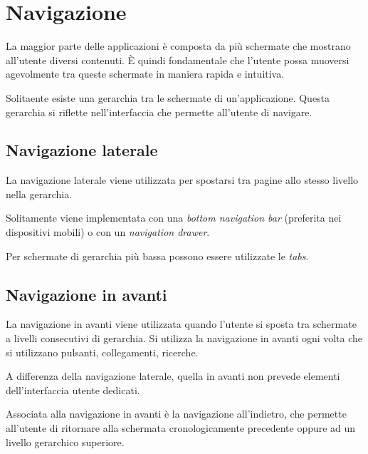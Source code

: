 \documentclass[12pt, a4paper]{report}
\begin{document}
		
	\section{Navigazione}
    	La maggior parte delle applicazioni è composta da più schermate che mostrano all’utente diversi contenuti. È quindi fondamentale che l’utente possa muoversi agevolmente tra queste schermate in maniera rapida e intuitiva.
    	
    	Solitaente esiste una gerarchia tra le schermate di un'applicazione. Questa gerarchia si riflette nell'interfaccia che permette all'utente di navigare.
    	
    		\subsection{Navigazione laterale}
    		La navigazione laterale viene utilizzata per spostarsi tra pagine allo stesso livello nella gerarchia.
    		
    		Solitamente viene implementata con una \textit{bottom navigation bar} (preferita nei dispositivi mobili) o con un \textit{navigation drawer}.
    		
    		Per schermate di gerarchia più bassa possono essere utilizzate le \textit{tabs}.
    		
    		\subsection{Navigazione in avanti}
    		La navigazione in avanti viene utilizzata quando l'utente si sposta tra schermate a livelli consecutivi di gerarchia. Si utilizza la navigazione in avanti ogni volta che si utilizzano pulsanti, collegamenti, ricerche.
    		
    		A differenza della navigazione laterale, quella in avanti non prevede elementi dell'interfaccia utente dedicati.
    		
    		Associata alla navigazione in avanti è la navigazione all'indietro, che permette all'utente di ritornare alla schermata cronologicamente precedente oppure ad un livello gerarchico superiore.
\end{document}
